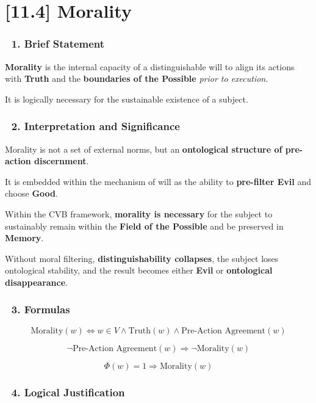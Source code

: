 \documentclass[12pt]{article}
\begin{document}
\section*{[11.4] Morality}

\subsubsection*{🔹 1. Brief Statement}

\textbf{Morality} is the internal capacity of a distinguishable will to align its actions with \textbf{Truth} and the \textbf{boundaries of the Possible} \textit{prior to execution}.

It is logically necessary for the sustainable existence of a subject.

\subsubsection*{🔹 2. Interpretation and Significance}

Morality is not a set of external norms, but an \textbf{ontological structure of pre-action discernment}.

It is embedded within the mechanism of will as the ability to \textbf{pre-filter Evil} and choose \textbf{Good}.

Within the CVB framework, \textbf{morality is necessary} for the subject to sustainably remain within the \textbf{Field of the Possible} and be preserved in \textbf{Memory}.

Without moral filtering, \textbf{distinguishability collapses}, the subject loses ontological stability, and the result becomes either \textbf{Evil} or \textbf{ontological disappearance}.

\subsubsection*{🔹 3. Formulas}

\[
\text{Morality}(w) \iff w \in V \land \text{Truth}(w) \land \text{Pre-Action Agreement}(w)
\]

\[
\neg \text{Pre-Action Agreement}(w) \Rightarrow \neg \text{Morality}(w)
\]

\[
\Phi(w) = 1 \Rightarrow \text{Morality}(w)
\]

\subsubsection*{🔹 4. Logical Justification}
\end{document}
